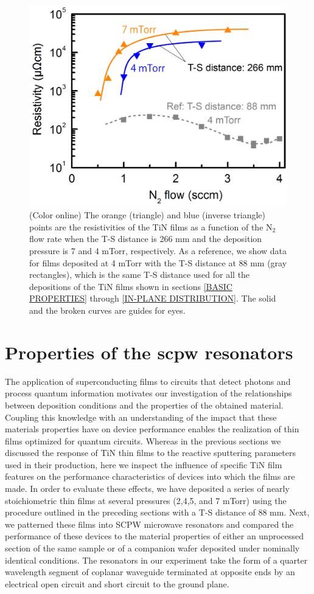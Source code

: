 \begin{figure}
\begin{center}
\includegraphics[width=125mm]{TS-change.jpg}
\end{center}
\caption{(Color online) The orange (triangle) and blue (inverse triangle) points are the resistivities of the TiN films as a function of the N$_{2}$ flow rate when the T-S distance is 266 mm and the deposition pressure is 7 and 4 mTorr, respectively. As a reference, we show data for films deposited at 4 mTorr with the T-S distance at 88 mm (gray rectangles), which is the same T-S distance used for all the depositions of the TiN films shown in sections \ref{BASIC PROPERTIES} through \ref{IN-PLANE DISTRIBUTION}. The solid and the broken curves are guides for eyes.}
\label{TS-change}
\end{figure}
\section{Properties of the scpw resonators}
The application of superconducting films to circuits that detect photons and process quantum information motivates our investigation of the relationships between deposition conditions and the properties of the obtained material. Coupling this knowledge with an understanding of the impact that these materials properties have on device performance enables the realization of thin films optimized for quantum circuits.  Whereas in the previous sections we discussed the response of TiN thin films to the reactive sputtering parameters used in their production, here we inspect the influence of specific TiN film features on the performance characteristics of devices into which the films are made.  In order to evaluate these effects, we have deposited a series of nearly stoichiometric thin films at several pressures (2,4,5, and 7 mTorr) using the procedure outlined in the preceding sections with a T-S distance of 88 mm.  Next, we patterned these films into SCPW microwave resonators and compared the performance of these devices to the material properties of either an unprocessed section of the same sample or of a companion wafer deposited under nominally identical conditions.  The resonators in our experiment take the form of a quarter wavelength segment of coplanar waveguide terminated at opposite ends by an electrical open circuit and short circuit to the ground plane.

